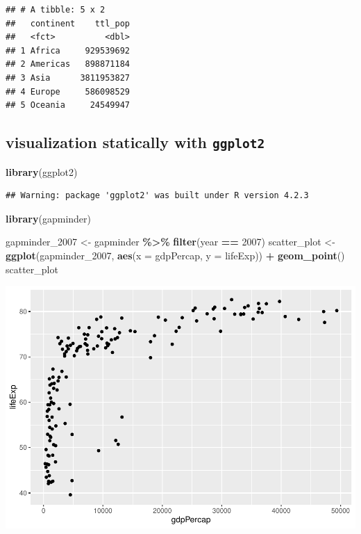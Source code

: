 \documentclass[
]{book}
\newenvironment{Shaded}{\begin{snugshade}}{\end{snugshade}}
\newcommand{\AttributeTok}[1]{\textcolor[rgb]{0.13,0.29,0.53}{#1}}
\newcommand{\DecValTok}[1]{\textcolor[rgb]{0.00,0.00,0.81}{#1}}
\newcommand{\FunctionTok}[1]{\textcolor[rgb]{0.13,0.29,0.53}{\textbf{#1}}}
\newcommand{\NormalTok}[1]{#1}
\newcommand{\OtherTok}[1]{\textcolor[rgb]{0.56,0.35,0.01}{#1}}
\newcommand{\SpecialCharTok}[1]{\textcolor[rgb]{0.81,0.36,0.00}{\textbf{#1}}}
\theoremstyle{definition}
\theoremstyle{definition}
\theoremstyle{definition}
\theoremstyle{definition}
\theoremstyle{remark}
\begin{document}
\begin{verbatim}
## # A tibble: 5 x 2
##   continent    ttl_pop
##   <fct>          <dbl>
## 1 Africa     929539692
## 2 Americas   898871184
## 3 Asia      3811953827
## 4 Europe     586098529
## 5 Oceania     24549947
\end{verbatim}

\hypertarget{visualization-statically-with-ggplot2}{%
\subsection{\texorpdfstring{visualization statically with \texttt{ggplot2}}{visualization statically with ggplot2}}\label{visualization-statically-with-ggplot2}}

\begin{Shaded}
\begin{Highlighting}[]
\FunctionTok{library}\NormalTok{(ggplot2)}
\end{Highlighting}
\end{Shaded}

\begin{verbatim}
## Warning: package 'ggplot2' was built under R version 4.2.3
\end{verbatim}

\begin{Shaded}
\begin{Highlighting}[]
\FunctionTok{library}\NormalTok{(gapminder)}

\NormalTok{gapminder\_2007 }\OtherTok{\textless{}{-}}\NormalTok{ gapminder }\SpecialCharTok{\%\textgreater{}\%}
  \FunctionTok{filter}\NormalTok{(year }\SpecialCharTok{==} \DecValTok{2007}\NormalTok{)}
\NormalTok{scatter\_plot }\OtherTok{\textless{}{-}} \FunctionTok{ggplot}\NormalTok{(gapminder\_2007, }\FunctionTok{aes}\NormalTok{(}\AttributeTok{x =}\NormalTok{ gdpPercap, }\AttributeTok{y =}\NormalTok{ lifeExp)) }\SpecialCharTok{+}
  \FunctionTok{geom\_point}\NormalTok{()}
\NormalTok{scatter\_plot}
\end{Highlighting}
\end{Shaded}

\includegraphics{202402211401-R_files/figure-latex/unnamed-chunk-19-1.pdf}
\end{document}
